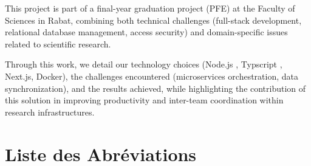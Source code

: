 \documentclass[12pt]{rapportPfe}
\begin{document}
This project is part of a final-year graduation project (PFE) at the Faculty of Sciences in Rabat, combining both technical challenges (full-stack development, relational database management, access security) and domain-specific issues related to scientific research.

Through this work, we detail our technology choices (Node.js , Typscript , Next.js, Docker), the challenges encountered (microservices orchestration, data synchronization), and the results achieved, while highlighting the contribution of this solution in improving productivity and inter-team coordination within research infrastructures.

\chapter*{Liste des Abréviations}
\end{document}
